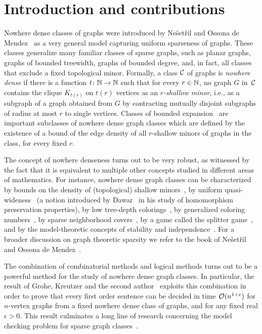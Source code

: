 \section{Introduction and contributions}\label{sec:intro}

Nowhere dense classes of graphs were introduced 
by Ne\v set\v ril and Ossona de 
Mendez~\cite{nevsetvril2010first,nevsetvril2011nowhere} as a very 
general model
capturing uniform sparseness of graphs. These classes generalize many 
familiar classes of sparse graphs, such as planar graphs, graphs 
of bounded treewidth,  graphs of bounded degree, and, in fact, 
all classes that exclude a fixed 
topological minor.
Formally, a class $\mathcal{C}$ of graphs is {\em{nowhere dense}} if there is a function $t\colon \mathbb{N}\to \mathbb{N}$ such that for every $r\in \mathbb{N}$, no graph $G$ in~$\mathcal{C}$ contains the clique $K_{t(r)}$ on $t(r)$ vertices  as an {\em{$r$-shallow minor}},
i.e., as a subgraph of a graph obtained from $G$ by contracting mutually disjoint  subgraphs of radius at most $r$ to single vertices.
Classes of bounded expansion~\cite{nevsetvril2008grad} 
are important subclasses 
of nowhere dense graph classes which are defined by the existence of a bound of 
the edge density of all $r$-shallow minors of graphs in the class, for every fixed $r$.


The concept of nowhere denseness
turns out to be very robust, as witnessed by the fact that it is equivalent 
to multiple other concepts studied in different areas of mathematics. 
For instance,  nowhere dense graph classes can be characterized 
by bounds on the density of (topological) shallow 
minors~\cite{nevsetvril2010first,nevsetvril2011nowhere},
by uniform quasi-wideness~\cite{nevsetvril2011nowhere} (a notion introduced by
Dawar~\cite{dawar2010homomorphism} in his study of homomorphism
preservation properties), by low tree-depth
colorings~\cite{nevsetvril2008grad}, by generalized coloring
numbers~\cite{zhu2009coloring}, by sparse neighborhood
covers~\cite{GroheKRSS15,grohe2014deciding}, by a game called the
splitter game~\cite{grohe2014deciding}, and by the model-theoretic
concepts of stability and independence~\cite{adler2014interpreting}.
For a broader discussion on  graph theoretic sparsity we refer to the book
of Ne\v{s}et\v{r}il and Ossona de Mendez~\cite{sparsity}.

The combination of combinatorial methods and logical methods turns out to be a powerful method for the study
of nowhere dense graph classes. In particular, 
the result of Grohe, Kreutzer and the second author~\cite{grohe2014deciding} exploits 
this combination in order to prove that every
first order sentence can be decided in time 
$\mathcal{O}(n^{1+\varepsilon})$ for $n$-vertex graphs from a fixed nowhere dense class of graphs, and for any fixed real $\epsilon>0$. This result culminates a long line of research concerning the model checking problem for 
sparse graph classes~\cite{}.

